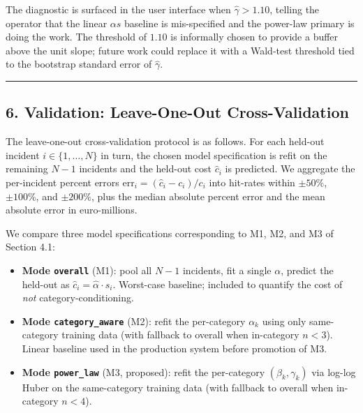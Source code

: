 \documentclass[
]{article}
\providecommand{\tightlist}{%
  \setlength{\itemsep}{0pt}\setlength{\parskip}{0pt}}
\begin{document}
The diagnostic is surfaced in the user interface when
\(\hat{\gamma} > 1.10\), telling the operator that the linear
\(\alpha s\) baseline is mis-specified and the power-law primary is
doing the work. The threshold of \(1.10\) is informally chosen to
provide a buffer above the unit slope; future work could replace it with
a Wald-test threshold tied to the bootstrap standard error of
\(\hat{\gamma}\).

\begin{center}\rule{0.5\linewidth}{0.5pt}\end{center}

\subsection{6. Validation: Leave-One-Out
Cross-Validation}\label{validation-leave-one-out-cross-validation}

The leave-one-out cross-validation protocol is as follows. For each
held-out incident \(i \in \{1, \ldots, N\}\) in turn, the chosen model
specification is refit on the remaining \(N-1\) incidents and the
held-out cost \(\hat{c}_i\) is predicted. We aggregate the per-incident
percent errors \(\text{err}_i = (\hat{c}_i - c_i) / c_i\) into hit-rates
within \(\pm 50\%\), \(\pm 100\%\), and \(\pm 200\%\), plus the median
absolute percent error and the mean absolute error in euro-millions.

We compare three model specifications corresponding to M1, M2, and M3 of
Section 4.1:

\begin{itemize}
\tightlist
\item
  \textbf{Mode \texttt{overall}} (M1): pool all \(N-1\) incidents, fit a
  single \(\alpha\), predict the held-out as
  \(\hat{c}_i = \hat{\alpha} \cdot s_i\). Worst-case baseline; included
  to quantify the cost of \emph{not} category-conditioning.
\item
  \textbf{Mode \texttt{category\_aware}} (M2): refit the per-category
  \(\alpha_k\) using only same-category training data (with fallback to
  overall when in-category \(n < 3\)). Linear baseline used in the
  production system before promotion of M3.
\item
  \textbf{Mode \texttt{power\_law}} (M3, proposed): refit the
  per-category \((\beta_k, \gamma_k)\) via log-log Huber on the
  same-category training data (with fallback to overall when in-category
  \(n < 4\)).
\end{itemize}
\end{document}

